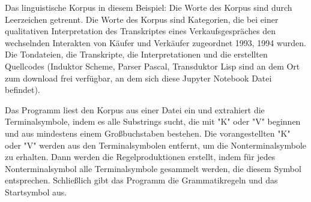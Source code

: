 \documentclass[12pt]{article}
\begin{document}
Das linguistische Korpus in diesem Beispiel: Die Worte des Korpus sind durch Leerzeichen getrennt. Die Worte des Korpus sind Kategorien, die bei einer qualitativen Interpretation des Transkriptes eines Verkaufsgespräches den  wechselnden Interakten von Käufer und Verkäufer zugeordnet 1993, 1994 wurden. Die Tondateien, die Transkripte, die Interpretationen und die erstellten Quellcodes (Induktor Scheme, Parser Pascal, Transduktor Lisp sind an dem Ort zum download frei verfügbar, an dem sich diese Jupyter Notebook Datei befindet).

Das Programm liest den Korpus aus einer Datei ein und extrahiert die Terminalsymbole, indem es alle Substrings sucht, die mit "K" oder "V" beginnen und aus mindestens einem Großbuchstaben bestehen. Die vorangestellten "K" oder "V" werden aus den Terminalsymbolen entfernt, um die Nonterminalsymbole zu erhalten. Dann werden die Regelproduktionen erstellt, indem für jedes Nonterminalsymbol alle Terminalsymbole gesammelt werden, die diesem Symbol entsprechen. Schließlich gibt das Programm die Grammatikregeln und das Startsymbol aus.
\end{document}
